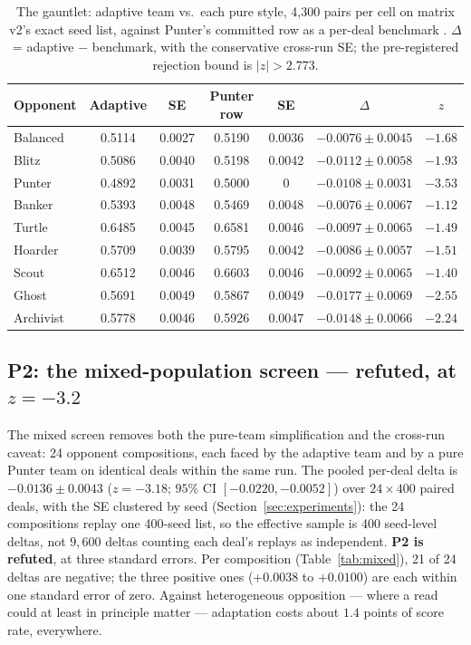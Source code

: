 \documentclass[11pt]{article}
\begin{document}
\begin{table}[t]
\centering
\caption{The gauntlet: adaptive team vs.\ each pure style, 4{,}300 pairs per cell on
matrix v2's exact seed list, against Punter's committed row as a per-deal benchmark
\cite{artifact}. $\Delta$ = adaptive $-$ benchmark, with the conservative cross-run SE;
the pre-registered rejection bound is $|z| > 2.773$.}
\label{tab:gauntlet}
\footnotesize
\begin{tabular}{@{}lcccccc@{}}
\toprule
Opponent & Adaptive & SE & Punter row & SE & $\Delta$ & $z$ \\
\midrule
Balanced  & 0.5114 & 0.0027 & 0.5190 & 0.0036 & $-0.0076 \pm 0.0045$ & $-1.68$ \\
Blitz     & 0.5086 & 0.0040 & 0.5198 & 0.0042 & $-0.0112 \pm 0.0058$ & $-1.93$ \\
Punter    & 0.4892 & 0.0031 & 0.5000 & 0      & $-0.0108 \pm 0.0031$ & $\mathbf{-3.53}$ \\
Banker    & 0.5393 & 0.0048 & 0.5469 & 0.0048 & $-0.0076 \pm 0.0067$ & $-1.12$ \\
Turtle    & 0.6485 & 0.0045 & 0.6581 & 0.0046 & $-0.0097 \pm 0.0065$ & $-1.49$ \\
Hoarder   & 0.5709 & 0.0039 & 0.5795 & 0.0042 & $-0.0086 \pm 0.0057$ & $-1.51$ \\
Scout     & 0.6512 & 0.0046 & 0.6603 & 0.0046 & $-0.0092 \pm 0.0065$ & $-1.40$ \\
Ghost     & 0.5691 & 0.0049 & 0.5867 & 0.0049 & $-0.0177 \pm 0.0069$ & $-2.55$ \\
Archivist & 0.5778 & 0.0046 & 0.5926 & 0.0047 & $-0.0148 \pm 0.0066$ & $-2.24$ \\
\bottomrule
\end{tabular}
\end{table}

\subsection{P2: the mixed-population screen --- refuted, at $z = -3.2$}
\label{sec:p2}

The mixed screen removes both the pure-team simplification and the cross-run caveat: 24
opponent compositions, each faced by the adaptive team and by a pure Punter team on
identical deals within the same run. The pooled per-deal delta is $-0.0136 \pm 0.0043$
($z = -3.18$; $95\%$ CI $[-0.0220, -0.0052]$) over $24 \times 400$ paired deals, with the
SE clustered by seed (Section~\ref{sec:experiments}): the 24 compositions replay one
400-seed list, so the effective sample is 400 seed-level deltas, not $9{,}600$ deltas
counting each deal's replays as independent. \textbf{P2 is refuted}, at three standard
errors. Per composition (Table~\ref{tab:mixed}), 21 of 24 deltas are negative; the three
positive ones ($+0.0038$ to $+0.0100$) are each within one standard error of zero. Against
heterogeneous opposition --- where a read could at least in principle matter ---
adaptation costs about $1.4$ points of score rate, everywhere.
\end{document}
